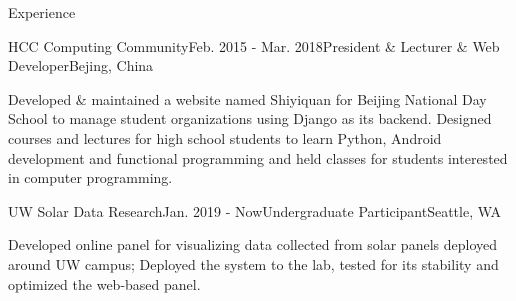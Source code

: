 \documentclass{resume}
\begin{document}
	\begin{rSection}{Experience}



		\begin{rSubsection}{HCC Computing Community}{Feb. 2015 - Mar. 2018}{President \& Lecturer \& Web Developer}{Bejing, China}
			\item Developed \& maintained a website named Shiyiquan for Beijing National Day School to manage student organizations using Django as its backend. Designed courses and lectures for high school students to learn Python, Android development and functional programming and held classes for students interested in computer programming.
		\end{rSubsection}
		\vspace{-5pt}
		\begin{rSubsection}{UW Solar Data Research}{Jan. 2019 - Now}{Undergraduate Participant}{Seattle, WA}
			\item Developed online panel for visualizing data collected from solar panels deployed around UW campus; Deployed the system to the lab, tested for its stability and optimized the web-based panel.
		\end{rSubsection}

	\end{rSection}
	\vspace{-5pt}
\end{document}
